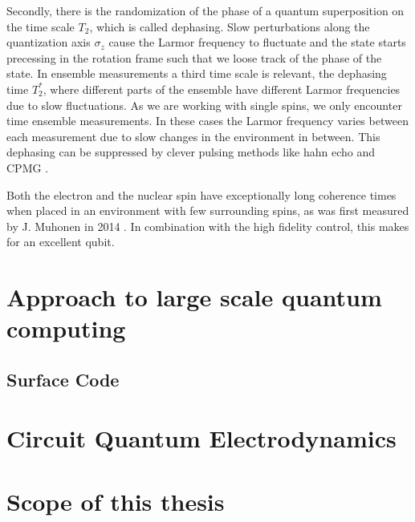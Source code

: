 Secondly, there is the randomization of the phase of a quantum superposition on the time scale $T_2$, which is called dephasing. Slow perturbations along the quantization axis $\sigma_z$ cause the Larmor frequency to fluctuate and the state starts precessing in the rotation frame such that we loose track of the phase of the state. 
In ensemble measurements a third time scale is relevant, the dephasing time $T_2^*$, where different parts of the ensemble have different Larmor frequencies due to slow fluctuations. As we are working with single spins, we only encounter time ensemble measurements. In these cases the Larmor frequency varies between each measurement due to slow changes in the environment in between. This dephasing can be suppressed by clever pulsing methods like hahn echo and CPMG \cite{CPMG}. 

Both the electron and the nuclear spin have exceptionally long coherence times when placed in an environment with few surrounding spins, as was first measured by J. Muhonen in 2014 \cite{Muhonen2014}. In combination with the high fidelity control, this makes for an excellent qubit.  



\section{Approach to large scale quantum computing} \label{sec:scaleup}

\subsection{Surface Code}

\section{Circuit Quantum Electrodynamics}

\section{Scope of this thesis}


